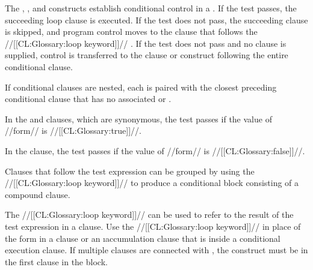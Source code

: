 

































The , , and  constructs
establish conditional control in a . If the test
passes, the succeeding loop clause is executed. If the test does
not pass, the succeeding clause is skipped, and program control
moves to the clause that follows the //[[CL:Glossary:loop keyword]]//
. If the test does not pass and no 
clause is supplied, control is transferred to the clause or
construct following the entire conditional clause.

If conditional clauses are nested, each  is paired
with the closest preceding conditional clause that has no
associated  or . 

In the  and  clauses, which are
synonymous, the test passes if the value of //form// is
//[[CL:Glossary:true]]//.





In the  clause,
the test passes if the value of //form// is //[[CL:Glossary:false]]//.


 
Clauses that follow the test expression can be grouped by using 
the //[[CL:Glossary:loop keyword]]//  to produce a conditional block consisting of 
a compound clause.
 






The //[[CL:Glossary:loop keyword]]//  can be used to refer to the result
of the test expression in a clause.
Use the //[[CL:Glossary:loop keyword]]//  in place of the form in a
 clause or an \i{accumulation} clause that is
inside a conditional execution clause.
If multiple clauses are connected with , the 
construct must be in the first clause in the block.


